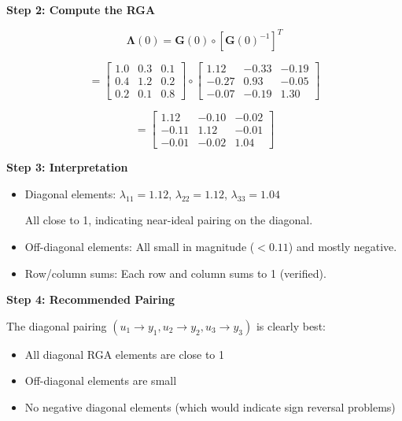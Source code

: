 \textbf{Step 2: Compute the RGA}

\begin{equation}
\boldsymbol{\Lambda}(0) = \mathbf{G}(0) \circ [\mathbf{G}(0)^{-1}]^T
\end{equation}

\begin{equation}
= \begin{bmatrix} 1.0 & 0.3 & 0.1 \\ 0.4 & 1.2 & 0.2 \\ 0.2 & 0.1 & 0.8 \end{bmatrix} \circ \begin{bmatrix} 1.12 & -0.33 & -0.19 \\ -0.27 & 0.93 & -0.05 \\ -0.07 & -0.19 & 1.30 \end{bmatrix}
\end{equation}

\begin{equation}
= \begin{bmatrix} 1.12 & -0.10 & -0.02 \\ -0.11 & 1.12 & -0.01 \\ -0.01 & -0.02 & 1.04 \end{bmatrix}
\end{equation}

\textbf{Step 3: Interpretation}

\begin{itemize}
\item Diagonal elements: $\lambda_{11} = 1.12$, $\lambda_{22} = 1.12$, $\lambda_{33} = 1.04$

All close to 1, indicating near-ideal pairing on the diagonal.

\item Off-diagonal elements: All small in magnitude ($< 0.11$) and mostly negative.

\item Row/column sums: Each row and column sums to 1 (verified).
\end{itemize}

\textbf{Step 4: Recommended Pairing}

The diagonal pairing $(u_1 \to y_1, u_2 \to y_2, u_3 \to y_3)$ is clearly best:
\begin{itemize}
\item All diagonal RGA elements are close to 1
\item Off-diagonal elements are small
\item No negative diagonal elements (which would indicate sign reversal problems)
\end{itemize}

